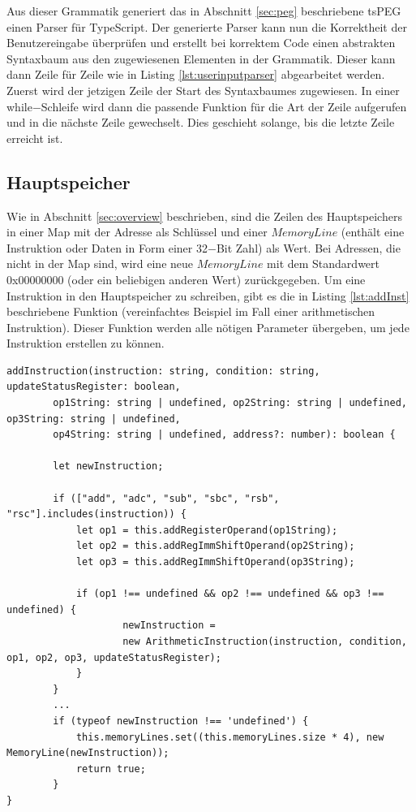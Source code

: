 \documentclass[a4paper, 11pt, onecolumn]{article}
\begin{document}
Aus dieser Grammatik generiert das in Abschnitt \ref{sec:peg} beschriebene tsPEG \cite{tspeg} einen Parser für TypeScript. Der generierte Parser kann nun die Korrektheit der Benutzereingabe überprüfen und erstellt bei korrektem Code einen abstrakten Syntaxbaum aus den zugewiesenen Elementen in der Grammatik. Dieser kann dann Zeile für Zeile wie in Listing \ref{lst:userinputparser} abgearbeitet werden. Zuerst wird der jetzigen Zeile der Start des Syntaxbaumes zugewiesen. In einer while$-$Schleife wird dann die passende Funktion für die Art der Zeile aufgerufen und in die nächste Zeile gewechselt. Dies geschieht solange, bis die letzte Zeile erreicht ist.\\

\subsection{Hauptspeicher}\label{sec:mainMemory}

Wie in Abschnitt \ref{sec:overview} beschrieben, sind die Zeilen des Hauptspeichers in einer Map mit der Adresse als Schlüssel und einer $MemoryLine$ (enthält eine Instruktion oder Daten in Form einer 32$-$Bit Zahl) als Wert. Bei Adressen, die nicht in der Map sind, wird eine neue $MemoryLine$ mit dem Standardwert 0x00000000 (oder ein beliebigen anderen Wert) zurückgegeben. Um eine Instruktion in den Hauptspeicher zu schreiben, gibt es die in Listing \ref{lst:addInst} beschriebene Funktion (vereinfachtes Beispiel im Fall einer arithmetischen Instruktion). Dieser Funktion werden alle nötigen Parameter übergeben, um jede Instruktion erstellen zu können.


\begin{lstlisting}[style=JavaScript, basicstyle=\footnotesize, backgroundcolor=\color{backcolour}, caption={Hinzufügen einer Instruktion am Beispiel einer arithmetischen Instruktion}, captionpos=b, label={lst:addInst}]
addInstruction(instruction: string, condition: string, updateStatusRegister: boolean,
        op1String: string | undefined, op2String: string | undefined, op3String: string | undefined,
        op4String: string | undefined, address?: number): boolean {

        let newInstruction;

        if (["add", "adc", "sub", "sbc", "rsb", "rsc"].includes(instruction)) {
            let op1 = this.addRegisterOperand(op1String);
            let op2 = this.addRegImmShiftOperand(op2String);
            let op3 = this.addRegImmShiftOperand(op3String);

            if (op1 !== undefined && op2 !== undefined && op3 !== undefined) {
                    newInstruction =
                    new ArithmeticInstruction(instruction, condition, op1, op2, op3, updateStatusRegister);
            }
        }
        ...           
        if (typeof newInstruction !== 'undefined') {
            this.memoryLines.set((this.memoryLines.size * 4), new MemoryLine(newInstruction));
            return true;
        }   
}      	 
\end{lstlisting}
\end{document}
